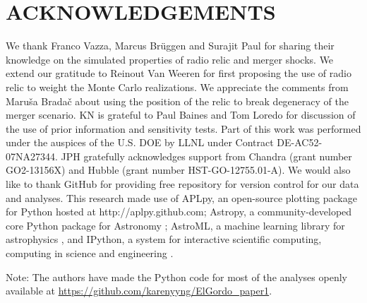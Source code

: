 \documentclass[letterpaper,useAMS,usenatbib]{mn2e}
\begin{document}
\section{ACKNOWLEDGEMENTS}
We thank Franco Vazza, Marcus Br\"{u}ggen and Surajit Paul for sharing
their knowledge on the simulated properties of radio relic and merger
shocks. We extend our gratitude to Reinout Van Weeren for first proposing the use of
radio relic to weight the Monte Carlo realizations. We appreciate the
comments from Maru\v{s}a Brada\v{c} about using the position of the relic to
break degeneracy of the merger scenario. KN is grateful to Paul Baines and
Tom Loredo for discussion of the use of prior information and sensitivity tests. 
Part of this work was performed under the auspices of the U.S. DOE by LLNL
under Contract DE-AC52-07NA27344. 
JPH gratefully acknowledges support from Chandra (grant number GO2-13156X)
and Hubble (grant number HST-GO-12755.01-A).
We would also like to thank 
GitHub for providing free repository for version control for our data and
analyses. This research made use of APLpy, an open-source plotting package for Python
hosted at http://aplpy.github.com; Astropy, a community-developed core
Python package for Astronomy \citep{astropy}; AstroML, a
machine learning library for astrophysics \citep{VanderPlas2012}, and IPython, a system for
interactive scientific computing, computing in science and engineering
\citep{Perez2007}.\par
Note: The authors have made the Python code for most of the analyses openly
available at
\href{https://github.com/karenyyng/ElGordo\_paper1}{https://github.com/karenyyng/ElGordo\_paper1}. 



\appendix
\end{document}
